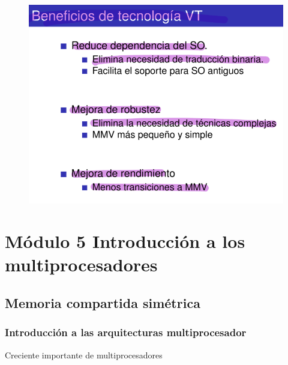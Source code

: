 \documentclass[12pt, twoside, openright]{report} %
\begin{document}
\begin{itemize}
\begin{figure}[H]
    \end{figure}
    \begin{figure}[H]
      {\includegraphics[scale=.4]{Untitled 44.png}}
    \end{figure}
  \end{itemize}

  \chapter{Módulo 5 Introducción a los multiprocesadores}

 \section{Memoria compartida simétrica}


  
\subsection{Introducción a las arquitecturas multiprocesador}


    Creciente importante de multiprocesadores
    \vspace{-0.5cm}
\end{document}
